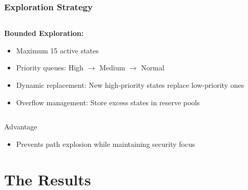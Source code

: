 \documentclass[aspectratio=169]{beamer}
\begin{document}
\begin{frame}
    \frametitle{Exploration Strategy}
    \vspace{1em}
    \begin{columns}
        \begin{column}{0.5\textwidth}
            \textbf{Bounded Exploration:}
            \begin{itemize}
                \item Maximum 15 active states
                \item Priority queues: High $\to$ Medium $\to$ Normal
                \item Dynamic replacement: New high-priority states replace low-priority ones
                \item Overflow management: Store excess states in reserve pools
            \end{itemize}
        \end{column}
        \begin{column}{0.5\textwidth}
        \end{column}
    \end{columns}
    
    \vspace{1em}
    \begin{evaluation}{Advantage}
        \begin{itemize}
            \item Prevents path explosion while maintaining security focus
        \end{itemize}
    \end{evaluation}
\end{frame}

\section{The Results}
\end{document}
